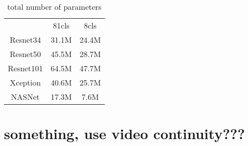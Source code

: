 \begin{table}
    \begin{tabular}{c|c|c}
     & 81cls & 8cls  \\
    Resnet34 & 31.1M & 24.4M\\
    Resnet50 & 45.5M & 28.7M\\
    Resnet101 & 64.5M & 47.7M \\
    Xception & 40.6M & 25.7M \\
    NASNet & 17.3M & 7.6M \\
    \end{tabular}
    \caption{total number of parameters}
    \label{tab:parameters}
\end{table}



\section{something, use video continuity???}